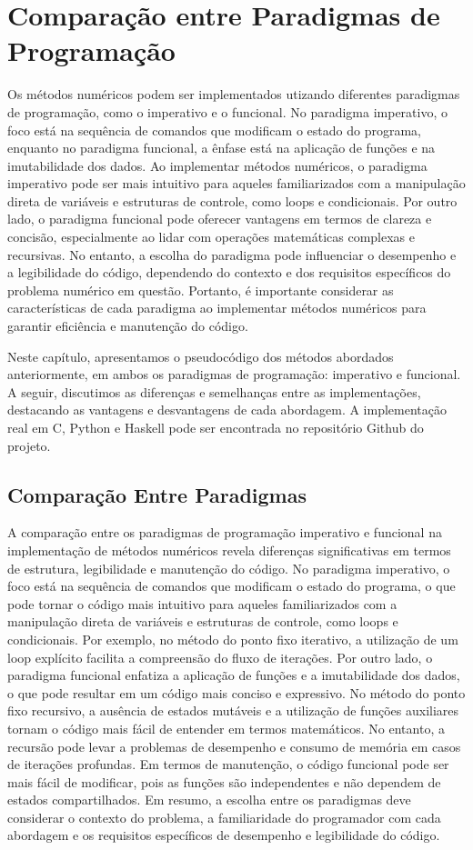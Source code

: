 \chapter{Comparação entre Paradigmas de Programação}
Os métodos numéricos podem ser implementados utizando diferentes paradigmas de programação, como o imperativo e o funcional. No paradigma imperativo, o foco está na sequência de comandos que modificam o estado do programa, enquanto no paradigma funcional, a ênfase está na aplicação de funções e na imutabilidade dos dados. Ao implementar métodos numéricos, o paradigma imperativo pode ser mais intuitivo para aqueles familiarizados com a manipulação direta de variáveis e estruturas de controle, como loops e condicionais. Por outro lado, o paradigma funcional pode oferecer vantagens em termos de clareza e concisão, especialmente ao lidar com operações matemáticas complexas e recursivas. No entanto, a escolha do paradigma pode influenciar o desempenho e a legibilidade do código, dependendo do contexto e dos requisitos específicos do problema numérico em questão. Portanto, é importante considerar as características de cada paradigma ao implementar métodos numéricos para garantir eficiência e manutenção do código.

Neste capítulo, apresentamos o pseudocódigo dos métodos abordados anteriormente, em ambos os paradigmas de programação: imperativo e funcional. A seguir, discutimos as diferenças e semelhanças entre as implementações, destacando as vantagens e desvantagens de cada abordagem. A implementação real em C, Python e Haskell pode ser encontrada no repositório Github do projeto.

\section{Comparação Entre Paradigmas}

A comparação entre os paradigmas de programação imperativo e funcional na implementação de métodos numéricos revela diferenças significativas em termos de estrutura, legibilidade e manutenção do código. No paradigma imperativo, o foco está na sequência de comandos que modificam o estado do programa, o que pode tornar o código mais intuitivo para aqueles familiarizados com a manipulação direta de variáveis e estruturas de controle, como loops e condicionais. Por exemplo, no método do ponto fixo iterativo, a utilização de um loop explícito facilita a compreensão do fluxo de iterações. Por outro lado, o paradigma funcional enfatiza a aplicação de funções e a imutabilidade dos dados, o que pode resultar em um código mais conciso e expressivo. No método do ponto fixo recursivo, a ausência de estados mutáveis e a utilização de funções auxiliares tornam o código mais fácil de entender em termos matemáticos. No entanto, a recursão pode levar a problemas de desempenho e consumo de memória em casos de iterações profundas. Em termos de manutenção, o código funcional pode ser mais fácil de modificar, pois as funções são independentes e não dependem de estados compartilhados. Em resumo, a escolha entre os paradigmas deve considerar o contexto do problema, a familiaridade do programador com cada abordagem e os requisitos específicos de desempenho e legibilidade do código.

